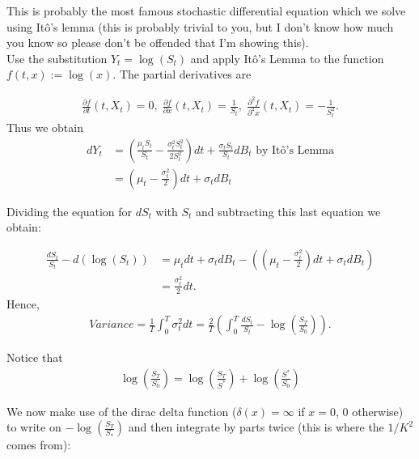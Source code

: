 This is probably the most famous stochastic differential equation which we solve using Itô's lemma (this is probably trivial to you, but I don't know how much you know so please don't be offended that I'm showing this).\\

Use the substitution $Y_t=\log (S_t)$ and apply It\^o's Lemma to the function $f(t,x):=\log (x)$.
The partial derivatives are

\begin{align}
\frac{\partial f}{\partial t}(t,X_t)=0,\;
\frac{\partial f}{\partial x}(t,X_t)=\frac{1}{S_t},\;
\frac{\partial^2 f}{\partial^2 x}(t,X_t)=-\frac{1}{S_t^2}. 
\end{align}
Thus we obtain 
\begin{align*}
dY_t&=\left(\frac{\mu_tS_t}{S_t}-\frac{\sigma_t^2S_t^2}{2S_t^2}\right)dt+
\frac{\sigma_tS_t}{S_t}dB_t \text{ by It\^o's Lemma} \\
&=\left(\mu_t-\frac{\sigma_t^2}{2}\right)dt+\sigma_tdB_t
\end{align*}

Dividing the equation for $dS_t$ with $S_t$ and subtracting this last equation we obtain:

\begin{align*}
\frac{dS_t}{S_t}-d(\log(S_t))&=\mu_tdt+\sigma_tdB_t-\left(\left(\mu_t-\frac{\sigma_t^2}{2}\right)dt+\sigma_tdB_t\right)\\
&=\frac{\sigma_t^2}{2}dt.
\end{align*}
Hence,
\begin{align*}
Variance = \frac{1}{T}\int_{0}^{T}\sigma_t^2dt=\frac{2}{T}\left(\int_{0}^{T}\frac{dS_t}{S_t}-\log(\frac{S_T}{S_0})\right).
\end{align*}

Notice that
\begin{align*}
\log\left(\frac{S_T}{S_0}\right)=\log\left(\frac{S_T}{S^*}\right)+\log\left(\frac{S^*}{S_0}\right)
\end{align*}

We now make use of the dirac delta function ($\delta(x)=\infty$ if $x=0$, $0$ otherwise) to write on $-\log\left(\frac{S_T}{S_*}\right)$ and then integrate by parts twice (this is where the $1/K^2$ comes from):

